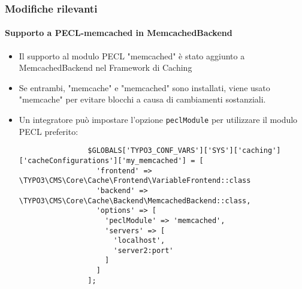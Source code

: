 \begin{frame}[fragile]
	\frametitle{Modifiche rilevanti}
	\framesubtitle{Supporto a PECL-memcached in MemcachedBackend}

	\lstset{basicstyle=\tiny\ttfamily}

	\begin{itemize}

		\item Il supporto al modulo PECL "memcached" è stato aggiunto a
			MemcachedBackend nel Framework di Caching

		\item Se entrambi, "memcache" e "memcached" sono installati, viene usato "memcache"
			per evitare blocchi a causa di cambiamenti sostanziali.

		\item Un integratore può impostare l'opzione \texttt{peclModule} per utilizzare
			il modulo PECL preferito:

			\begin{lstlisting}
				$GLOBALS['TYPO3_CONF_VARS']['SYS']['caching']['cacheConfigurations']['my_memcached'] = [
				  'frontend' => \TYPO3\CMS\Core\Cache\Frontend\VariableFrontend::class
				  'backend' => \TYPO3\CMS\Core\Cache\Backend\MemcachedBackend::class,
				  'options' => [
				    'peclModule' => 'memcached',
				    'servers' => [
				      'localhost',
				      'server2:port'
				    ]
				  ]
				];
			\end{lstlisting}

	\end{itemize}

\end{frame}


